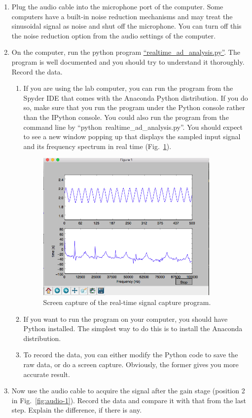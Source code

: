 \documentclass[letterpaper, 11pt]{article}
\begin{document}
\begin{enumerate}
	\item Plug the audio cable into the microphone port of the computer. Some computers have a built-in noise reduction mechanisms and may treat the sinusoidal signal as noise and shut off the microphone. You can turn off this the noise reduction option from the audio settings of the computer.  
	
	\item On the computer, run the python program \href{https://github.com/ucdart/UCD-EEC134/blob/master/labs/lab1/code/realtime_audio_analysis.py}{``realtime\_ad\_analysis.py''}. The program is well documented and you should try to understand it thoroughly. Record the data. 
	\begin{enumerate}
		\item If you are using the lab computer, you can run the program from the Spyder IDE that comes with the Anaconda Python distribution. If you do so, make sure that you run the program under the Python console rather than the IPython console. You could also run the program from the command line by ``python~realtime\_ad\_analysis.py''. You should expect to see a new window popping up that displays the sampled input signal and its frequency spectrum in real time (Fig.~\ref{fig:audio-capture-ad}). 
		\begin{figure}[h]
			\centering
			\includegraphics[width=3.5in]{audio-capture-ad.png}
			\caption{Screen capture of the real-time signal capture program.}
			\label{fig:audio-capture-ad}
		\end{figure}
		
		\item If you want to run the program on your computer, you should have Python installed. The simplest way to do this is to install the Anaconda distribution. 
		
		\item To record the data, you can either modify the Python code to save the raw data, or do a screen capture. Obviously, the former gives you more accurate result. 
	\end{enumerate}
	
	\item Now use the audio cable to acquire the signal after the gain stage (position 2 in Fig.~\ref{fig:audio-1}). Record the data and compare it with that from the last step. Explain the difference, if there is any. 
\end{enumerate}
\end{document}
